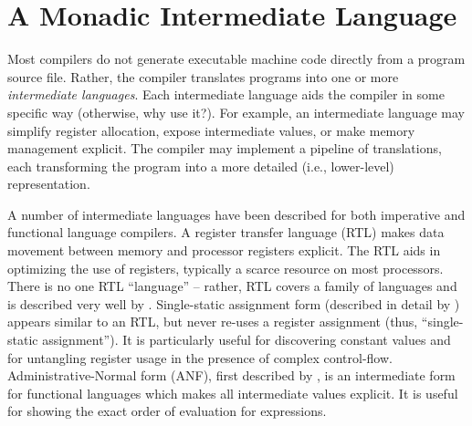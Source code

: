 \documentclass[12pt]{report}
\begin{document}


\chapter{A Monadic Intermediate Language}
\label{ref_chapter_mil}








Most compilers do not generate executable machine code directly from a
program source file. Rather, the compiler translates programs into one
or more \emph{intermediate languages}. Each intermediate language aids
the compiler in some specific way (otherwise, why use it?). For
example, an intermediate language may simplify register allocation,
expose intermediate values, or make memory management explicit. The
compiler may implement a pipeline of translations, each transforming
the program into a more detailed (i.e., lower-level) representation.

A number of intermediate languages have been described for both
imperative and functional language compilers. A register transfer
language (RTL) makes data movement between memory and processor
registers explicit. The RTL aids in optimizing the use of registers,
typically a scarce resource on most processors. There is no one RTL
``language'' -- rather, RTL covers a family of languages and is
described very well by \cite{Torczon2007}
\citep{Torczon2007}. Single-static assignment form (described in
detail by \cite{Muchnick1998} \citep{Muchnick1998}) appears similar to
an RTL, but never re-uses a register assignment (thus, ``single-static
assignment''). It is particularly useful for discovering constant
values and for untangling register usage in the presence of complex
control-flow. Administrative-Normal form (ANF), first described by
\cite{Flanagan1993} \citep{Flanagan1993}, is an intermediate form for
functional languages which makes all intermediate values explicit. It
is useful for showing the exact order of evaluation for expressions.
\end{document}
